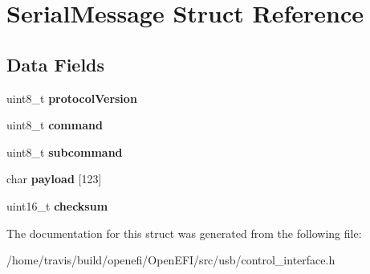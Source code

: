 \hypertarget{structSerialMessage}{}\section{Serial\+Message Struct Reference}
\label{structSerialMessage}
\subsection*{Data Fields}
\begin{DoxyCompactItemize}
\item 
uint8\+\_\+t {\bfseries protocol\+Version}\hypertarget{structSerialMessage_aa41cdf6c9d8001119b5be27070271b98}{}\label{structSerialMessage_aa41cdf6c9d8001119b5be27070271b98}

\item 
uint8\+\_\+t {\bfseries command}\hypertarget{structSerialMessage_a71592aeef849dda1b4e5fddbb739607b}{}\label{structSerialMessage_a71592aeef849dda1b4e5fddbb739607b}

\item 
uint8\+\_\+t {\bfseries subcommand}\hypertarget{structSerialMessage_a5417ab8ac06f6d763b4c3edf398e8319}{}\label{structSerialMessage_a5417ab8ac06f6d763b4c3edf398e8319}

\item 
char {\bfseries payload} \mbox{[}123\mbox{]}\hypertarget{structSerialMessage_a14f2756e0f5ed02b81b3c6efd55b579e}{}\label{structSerialMessage_a14f2756e0f5ed02b81b3c6efd55b579e}

\item 
uint16\+\_\+t {\bfseries checksum}\hypertarget{structSerialMessage_aaa01e1797fe94805deb1cc04dc2a7c6a}{}\label{structSerialMessage_aaa01e1797fe94805deb1cc04dc2a7c6a}

\end{DoxyCompactItemize}


The documentation for this struct was generated from the following file\+:\begin{DoxyCompactItemize}
\item 
/home/travis/build/openefi/\+Open\+E\+F\+I/src/usb/control\+\_\+interface.\+h\end{DoxyCompactItemize}
